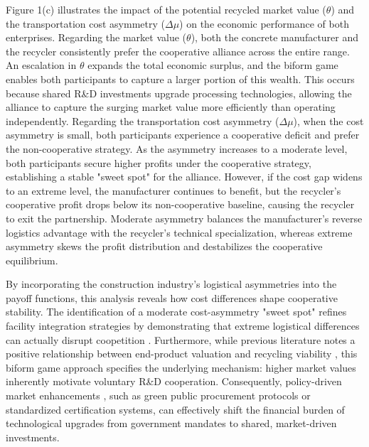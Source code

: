 \documentclass[authoryear,preprint,review,times,10pt]{elsarticle}
\begin{document}
Figure 1(c) illustrates the impact of the potential recycled market value ($\theta$) and the transportation cost asymmetry ($\Delta\mu$) on the economic performance of both enterprises. Regarding the market value ($\theta$), both the concrete manufacturer and the recycler consistently prefer the cooperative alliance across the entire range. An escalation in $\theta$ expands the total economic surplus, and the biform game enables both participants to capture a larger portion of this wealth. This occurs because shared R\&D investments upgrade processing technologies, allowing the alliance to capture the surging market value more efficiently than operating independently. Regarding the transportation cost asymmetry ($\Delta\mu$), when the cost asymmetry is small, both participants experience a cooperative deficit and prefer the non-cooperative strategy. As the asymmetry increases to a moderate level, both participants secure higher profits under the cooperative strategy, establishing a stable "sweet spot" for the alliance. However, if the cost gap widens to an extreme level, the manufacturer continues to benefit, but the recycler's cooperative profit drops below its non-cooperative baseline, causing the recycler to exit the partnership. Moderate asymmetry balances the manufacturer's reverse logistics advantage with the recycler's technical specialization, whereas extreme asymmetry skews the profit distribution and destabilizes the cooperative equilibrium.

By incorporating the construction industry's logistical asymmetries into the payoff functions, this analysis reveals how cost differences shape cooperative stability. The identification of a moderate cost-asymmetry "sweet spot" refines facility integration strategies \citep{liu2019Expand} by demonstrating that extreme logistical differences can actually disrupt coopetition \citep{lin2025Cooperation}. Furthermore, while previous literature notes a positive relationship between end-product valuation and recycling viability \citep{li2020Key}, this biform game approach specifies the underlying mechanism: higher market values inherently motivate voluntary R\&D cooperation. Consequently, policy-driven market enhancements \citep{su2024Stakeholder}, such as green public procurement protocols or standardized certification systems, can effectively shift the financial burden of technological upgrades from government mandates to shared, market-driven investments.
\end{document}
